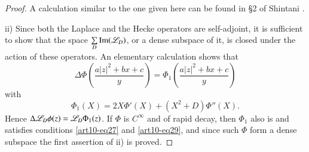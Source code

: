 \begin{proof}
A calculation similar to the one given here can be found in \S 2 of Shintani \cite{art10-8}.

\medskip
ii) Since both the Laplace and the Hecke operators are self-adjoint, it is sufficient to show that the space $\sum\limits_D \operatorname{Im} (\mathscr{L}_D)$, or a dense subspace of it, is closed under the action of these operators. An elementary calculation shows that 
\begin{equation*}
\Delta \Phi \left(\frac{a|z|^2 + b x+ c}{y} \right) = \Phi_1 \left(\frac{a|z|^2 + b x + c}{y} \right) \tag{34}\label{art10-eq34}
\end{equation*}
with 
\begin{equation*}
\Phi_1 (X) = 2 X \Phi'(X) + (X^2+ D) \Phi'' (X). \tag{35} \label{art10-eq35}
\end{equation*}
Hence $\Delta \mathscr{L}_D \phi (z) = \mathscr{L}_D \Phi_1 (z)$. If $\Phi$ is $C^\infty$ and of rapid decay, then $\Phi_1$ also is and satisfies conditions \eqref{art10-eq27} and \eqref{art10-eq29}, and since such $\Phi$ form a dense subspace the first assertion of ii) is proved.


\end{proof}
